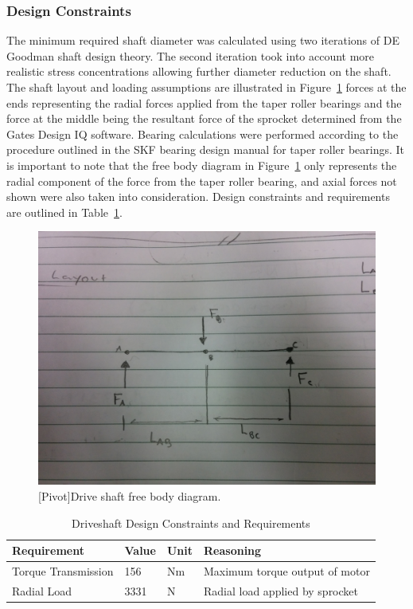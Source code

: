 \subsubsection{Design Constraints}

The minimum required shaft diameter was calculated using two iterations of DE Goodman shaft design theory. The second iteration took into account more realistic stress concentrations allowing further diameter reduction on the shaft. The shaft layout and loading assumptions are illustrated in Figure~\ref{fig:fb_output_shaft} forces at the ends representing the radial forces applied from the taper roller bearings and the force at the middle being the resultant force of the sprocket determined from the Gates Design IQ software. Bearing calculations were performed according to the procedure outlined in the SKF bearing design manual for taper roller bearings. It is important to note that the free body diagram in Figure~\ref{fig:fb_output_shaft} only represents the radial component of the force from the taper roller bearing, and axial forces not shown were also taken into consideration. Design constraints and requirements are outlined in Table~\ref{tab:drive_const}.  

\begin{figure}[htbp]
\centering
\includegraphics[height=0.3\textheight]{./images/fb_output_shaft}
[Pivot]{Drive shaft free body diagram.}
\label{fig:fb_output_shaft}
\end{figure}
\newpage
\begin{table}[htbp]
 \centering
 \caption{Driveshaft Design Constraints and Requirements}
 \begin{tabular}{| llll |} \hline
 Requirement & Value & Unit & Reasoning \\ \hline
 Torque Transmission & 156 & Nm & Maximum torque output of motor \\
 Radial Load & 3331 & N & Radial load applied by sprocket \\ \hline
 \end{tabular}
 \label{tab:drive_const}
 \end{table}

